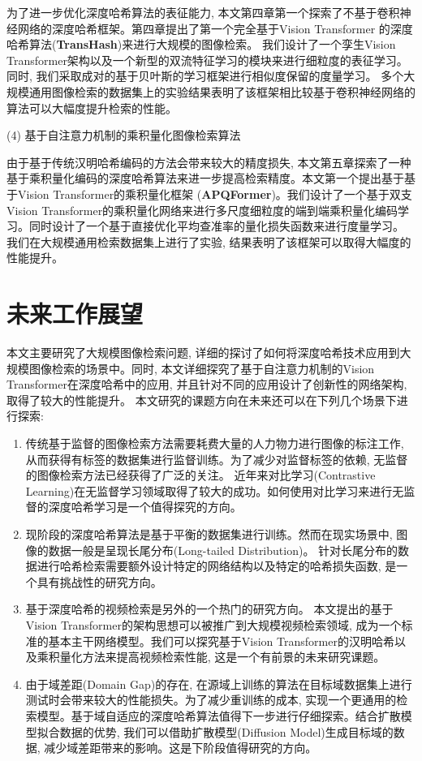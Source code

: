 为了进一步优化深度哈希算法的表征能力, 本文第四章第一个探索了不基于卷积神经网络的深度哈希框架。第四章提出了第一个完全基于Vision Transformer 的深度哈希算法(\textbf{TransHash})来进行大规模的图像检索。 我们设计了一个孪生Vision Transformer架构以及一个新型的双流特征学习的模块来进行细粒度的表征学习。 同时, 我们采取成对的基于贝叶斯的学习框架进行相似度保留的度量学习。 多个大规模通用图像检索的数据集上的实验结果表明了该框架相比较基于卷积神经网络的算法可以大幅度提升检索的性能。\par
(4) 基于自注意力机制的乘积量化图像检索算法 \par
由于基于传统汉明哈希编码的方法会带来较大的精度损失, 本文第五章探索了一种基于乘积量化编码的深度哈希算法来进一步提高检索精度。本文第一个提出基于基于Vision Transformer的乘积量化框架 (\textbf{APQFormer})。我们设计了一个基于双支Vision Transformer的乘积量化网络来进行多尺度细粒度的端到端乘积量化编码学习。同时设计了一个基于直接优化平均查准率的量化损失函数来进行度量学习。 我们在大规模通用检索数据集上进行了实验, 结果表明了该框架可以取得大幅度的性能提升。

\section{未来工作展望}
本文主要研究了大规模图像检索问题, 详细的探讨了如何将深度哈希技术应用到大规模图像检索的场景中。同时, 本文详细探究了基于自注意力机制的Vision Transformer在深度哈希中的应用, 并且针对不同的应用设计了创新性的网络架构, 取得了较大的性能提升。 本文研究的课题方向在未来还可以在下列几个场景下进行探索:
\begin{enumerate}
    \item 传统基于监督的图像检索方法需要耗费大量的人力物力进行图像的标注工作, 从而获得有标签的数据集进行监督训练。为了减少对监督标签的依赖, 无监督的图像检索方法已经获得了广泛的关注。 近年来对比学习(Contrastive Learning)在无监督学习领域取得了较大的成功。如何使用对比学习来进行无监督的深度哈希学习是一个值得探究的方向。
    \item 现阶段的深度哈希算法是基于平衡的数据集进行训练。然而在现实场景中, 图像的数据一般是呈现长尾分布(Long-tailed Distribution)。 针对长尾分布的数据进行哈希检索需要额外设计特定的网络结构以及特定的哈希损失函数, 是一个具有挑战性的研究方向。
    \item 基于深度哈希的视频检索是另外的一个热门的研究方向。 本文提出的基于Vision Transformer的架构思想可以被推广到大规模视频检索领域, 成为一个标准的基本主干网络模型。我们可以探究基于Vision Transformer的汉明哈希以及乘积量化方法来提高视频检索性能, 这是一个有前景的未来研究课题。
    \item 由于域差距(Domain Gap)的存在, 在源域上训练的算法在目标域数据集上进行测试时会带来较大的性能损失。为了减少重训练的成本, 实现一个更通用的检索模型。基于域自适应的深度哈希算法值得下一步进行仔细探索。结合扩散模型拟合数据的优势, 我们可以借助扩散模型(Diffusion Model)生成目标域的数据, 减少域差距带来的影响。这是下阶段值得研究的方向。
\end{enumerate}